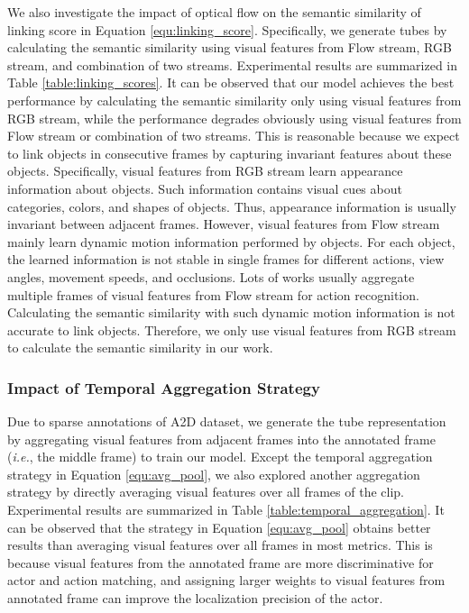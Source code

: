 \documentclass[journal]{IEEEtran}
\begin{document}
We also investigate the impact of optical flow on the semantic similarity of linking score in Equation \ref{equ:linking_score}. Specifically, we generate tubes by calculating the semantic similarity using visual features from Flow stream, RGB stream, and combination of two streams. Experimental results are summarized in Table \ref{table:linking_scores}. It can be observed that our model achieves the best performance by calculating the semantic similarity only using visual features from RGB stream, while the performance degrades obviously using visual features from Flow stream or combination of two streams. This is reasonable because we expect to link objects in consecutive frames by capturing invariant features about these objects. Specifically, visual features from RGB stream learn appearance information about objects. Such information contains visual cues about categories, colors, and shapes of objects. Thus, appearance information is usually invariant between adjacent frames. However, visual features from Flow stream mainly learn dynamic motion information performed by objects. For each object, the learned information is not stable in single frames for different actions, view angles, movement speeds, and occlusions. Lots of works \cite{kong2022human} usually aggregate multiple frames of visual features from Flow stream for action recognition. Calculating the semantic similarity with such dynamic motion information is not accurate to link objects. Therefore, we only use visual features from RGB stream to calculate the semantic similarity in our work.

\subsubsection{Impact of Temporal Aggregation Strategy}
Due to sparse annotations of A2D dataset, we generate the tube representation by aggregating visual features from adjacent frames into the annotated frame (\emph{i.e.}, the middle frame) to train our model. Except the temporal aggregation strategy in Equation \ref{equ:avg_pool}, we also explored another aggregation strategy by directly averaging visual features over all frames of the clip. Experimental results are summarized in Table \ref{table:temporal_aggregation}. It can be observed that the strategy in Equation \ref{equ:avg_pool} obtains better results than averaging visual features over all frames in most metrics. This is because visual features from the annotated frame are more discriminative for actor and action matching, and assigning larger weights to visual features from annotated frame can improve the localization precision of the actor.
\end{document}
